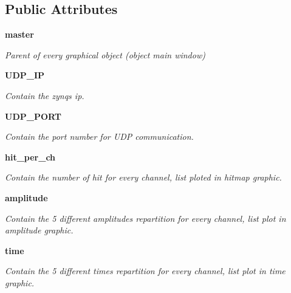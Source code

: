 \subsection*{Public Attributes}
\begin{DoxyCompactItemize}
\item 
\mbox{\label{classreceive_1_1_watchman__graphic__window_a03235614332394871ff2b4564bfa1ede}} 
\textbf{ master}
\begin{DoxyCompactList}\small\item\em Parent of every graphical object (object main window) \end{DoxyCompactList}\item 
\mbox{\label{classreceive_1_1_watchman__graphic__window_aeaa1e0bb21319a0670a9bb58c1a4c30f}} 
\textbf{ U\+D\+P\+\_\+\+IP}
\begin{DoxyCompactList}\small\item\em Contain the zynq\textquotesingle{}s ip. \end{DoxyCompactList}\item 
\mbox{\label{classreceive_1_1_watchman__graphic__window_a444ecc478655655d901cce4d07241c89}} 
\textbf{ U\+D\+P\+\_\+\+P\+O\+RT}
\begin{DoxyCompactList}\small\item\em Contain the port number for U\+DP communication. \end{DoxyCompactList}\item 
\mbox{\label{classreceive_1_1_watchman__graphic__window_a130ab136b3174db7b1687af21f3d25a6}} 
\textbf{ hit\+\_\+per\+\_\+ch}
\begin{DoxyCompactList}\small\item\em Contain the number of hit for every channel, list ploted in hitmap graphic. \end{DoxyCompactList}\item 
\mbox{\label{classreceive_1_1_watchman__graphic__window_ab1f197dab90dfb711e0651df55ca6ae2}} 
\textbf{ amplitude}
\begin{DoxyCompactList}\small\item\em Contain the 5 different amplitudes repartition for every channel, list plot in amplitude graphic. \end{DoxyCompactList}\item 
\mbox{\label{classreceive_1_1_watchman__graphic__window_a128b0a954ab706aa53827af0f36087b0}} 
\textbf{ time}
\begin{DoxyCompactList}\small\item\em Contain the 5 different times repartition for every channel, list plot in time graphic. \end{DoxyCompactList}\item 

\end{DoxyCompactItemize}
